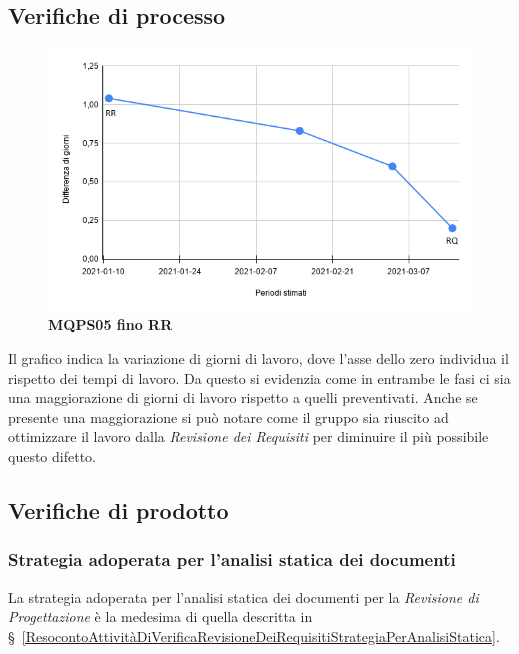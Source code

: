 {{\subsection{Verifiche di processo} \label{RevisioneDiProgettazioneVerificheDiProcesso}
\begin{center}
 \begin{figure}[H]
	 \includegraphics[width=1\linewidth]{../immagini/Metriche/MQPS05_RP.png}
	 \caption{\textbf{MQPS05 fino RR}}
 \end{figure}
\end{center}

Il grafico indica la variazione di giorni di lavoro, dove l'asse dello zero individua il rispetto dei tempi di lavoro. Da questo si evidenzia come in entrambe le fasi ci sia una maggiorazione di giorni di lavoro rispetto a quelli preventivati. Anche se presente una maggiorazione si può notare come il gruppo sia riuscito ad ottimizzare il lavoro dalla \textit{Revisione dei Requisiti} per diminuire il più possibile questo difetto.
 \subsection{Verifiche di prodotto} \label{ResocontoAttivitàDiVerificaRevisioneDiProgettazioneVerificheDiProdotto}
\subsubsection{Strategia adoperata per l’analisi statica dei documenti} \label{ResocontoAttivitàDiVerificaRevisioneDiProgettazioneVerificheDiProdottoStrategiaPerAnalisiStatica}
La strategia adoperata per l’analisi statica dei documenti per la \textit{Revisione di Progettazione} è la medesima di quella descritta in \S~\ref{ResocontoAttivitàDiVerificaRevisioneDeiRequisitiStrategiaPerAnalisiStatica}.
}}
